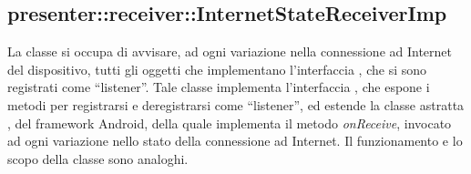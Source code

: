 \documentclass[../Tesi.tex]{subfiles}
\begin{document}
		\subsection{presenter::receiver::InternetStateReceiverImp}
		La classe  si occupa di avvisare, ad ogni variazione nella connessione ad Internet del dispositivo, tutti gli oggetti che implementano l'interfaccia , che si sono registrati come ``listener''. Tale classe implementa l'interfaccia , che espone i metodi per registrarsi e deregistrarsi come ``listener'', ed estende la classe astratta , del framework Android, della quale implementa il metodo \textit{onReceive}, invocato ad ogni variazione nello stato della connessione ad Internet. Il funzionamento e lo scopo della classe  sono analoghi. 
\end{document}
